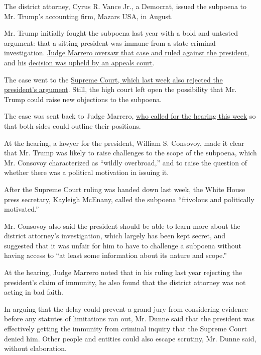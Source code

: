 The district attorney, Cyrus R. Vance Jr., a Democrat, issued the
subpoena to Mr. Trump's accounting firm, Mazars USA, in August.

Mr. Trump initially fought the subpoena last year with a bold and
untested argument: that a sitting president was immune from a state
criminal investigation.
\href{https://www.nytimes3xbfgragh.onion/2019/10/07/nyregion/trump-taxes-lawsuit-vance.html}{Judge
Marrero oversaw that case and ruled against the president}, and his
\href{https://www.nytimes3xbfgragh.onion/2019/11/04/nyregion/trump-taxes-vance-appeal.html}{decision
was upheld by an appeals court}.

The case went to the
\href{https://www.nytimes3xbfgragh.onion/2020/07/09/us/trump-taxes-supreme-court.html}{Supreme
Court, which last week also rejected the president's argument}. Still,
the high court left open the possibility that Mr. Trump could raise new
objections to the subpoena.

The case was sent back to Judge Marrero,
\href{https://www.nytimes3xbfgragh.onion/2020/07/15/nyregion/donald-trump-taxes-cyrus-vance.html}{who
called for the hearing this week} so that both sides could outline their
positions.

At the hearing, a lawyer for the president, William S. Consovoy, made it
clear that Mr. Trump was likely to raise challenges to the scope of the
subpoena, which Mr. Consovoy characterized as ``wildly overbroad,'' and
to raise the question of whether there was a political motivation in
issuing it.

After the Supreme Court ruling was handed down last week, the White
House press secretary, Kayleigh McEnany, called the subpoena ``frivolous
and politically motivated.''

Mr. Consovoy also said the president should be able to learn more about
the district attorney's investigation, which largely has been kept
secret, and suggested that it was unfair for him to have to challenge a
subpoena without having access to ``at least some information about its
nature and scope.''

At the hearing, Judge Marrero noted that in his ruling last year
rejecting the president's claim of immunity, he also found that the
district attorney was not acting in bad faith.

In arguing that the delay could prevent a grand jury from considering
evidence before any statutes of limitations ran out, Mr. Dunne said that
the president was effectively getting the immunity from criminal inquiry
that the Supreme Court denied him. Other people and entities could also
escape scrutiny, Mr. Dunne said, without elaboration.

